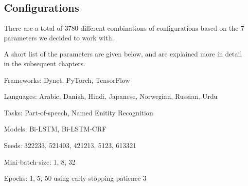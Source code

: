 
\subsection{Configurations}

There are a total of 3780 different combinations of configurations based on the
7 parameters we decided to work with. 

A short list of the parameters are given below, and are explained more in detail
in the subsequent chapters.

Frameworks: Dynet, PyTorch, TensorFlow

Languages: Arabic, Danish, Hindi, Japanese, Norwegian, Russian, Urdu

Tasks: Part-of-speech, Named Enitity Recognition

Models: Bi-LSTM, Bi-LSTM-CRF

Seeds: 322233, 521403, 421213, 5123, 613321

Mini-batch-size: 1, 8, 32

Epochs: 1, 5, 50 using early stopping patience 3


%
%
%
%


